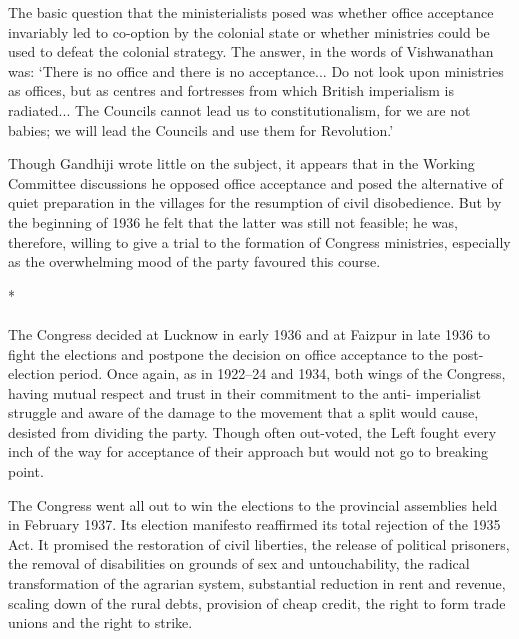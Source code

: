 The basic question that the ministerialists posed was whether office acceptance invariably led to co-option by the colonial state or whether ministries could be used to defeat the colonial strategy. The answer, in the words of Vishwanathan was: `There is no office and there is no acceptance... Do not look upon ministries as offices, but as centres and fortresses from which British imperialism is radiated... The Councils cannot lead us to constitutionalism, for we are not babies; we will lead the Councils and use them for Revolution.' 

Though Gandhiji wrote little on the subject, it appears that in the Working Committee discussions he opposed office acceptance and posed the alternative of quiet preparation in the villages for the resumption of civil disobedience. But by the beginning of 1936 he felt that the latter was still not feasible; he was, therefore, willing to give a trial to the formation of Congress ministries, especially as the overwhelming mood of the party favoured this course.

\begin{center}*\end{center}

\paragraph*{}

The Congress decided at Lucknow in early 1936 and at Faizpur in late 1936 to fight the elections and postpone the decision on office acceptance to the post-election period. Once again, as in 1922--24 and 1934, both wings of the Congress, having mutual respect and trust in their commitment to the anti- imperialist struggle and aware of the damage to the movement that a split would cause, desisted from dividing the party. Though often out-voted, the Left fought every inch of the way for acceptance of their approach but would not go to breaking point. 

The Congress went all out to win the elections to the provincial assemblies held in February 1937. Its election manifesto reaffirmed its total rejection of the 1935 Act. It promised the restoration of civil liberties, the release of political prisoners, the removal of disabilities on grounds of sex and untouchability, the radical transformation of the agrarian system, substantial reduction in rent and revenue, scaling down of the rural debts, provision of cheap credit, the right to form trade unions and the right to strike. 

